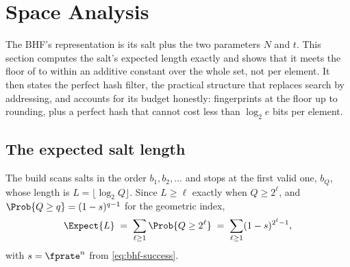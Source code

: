 %

\section{Space Analysis}
\label{sec:space-analysis}

The BHF's representation is its salt plus the two parameters $N$ and
$t$. This section computes the salt's expected length exactly and shows
that it meets the floor of  to within an
additive constant over the whole set, not per element. It then states
the perfect hash filter, the practical structure that replaces search by
addressing, and accounts for its budget honestly: fingerprints at the
floor up to rounding, plus a perfect hash that cannot cost less than
$\log_2 e$ bits per element.

\subsection*{The expected salt length}

The build scans salts in the order $b_1, b_2, \ldots$ and stops at the
first valid one, $b_Q$, whose length is $L = \lfloor \log_2 Q \rfloor$.
Since $L \ge \ell$ exactly when $Q \ge 2^{\ell}$, and $\Prob{Q \ge q} =
(1 - s)^{q - 1}$ for the geometric index,
\begin{equation}
\label{eq:bhf-salt-series}
  \Expect{L}
  \;=\; \sum_{\ell \ge 1} \Prob{Q \ge 2^{\ell}}
  \;=\; \sum_{\ell \ge 1} (1 - s)^{2^{\ell} - 1},
\end{equation}
with $s = \fprate^{n}$ from \eqref{eq:bhf-success}.

